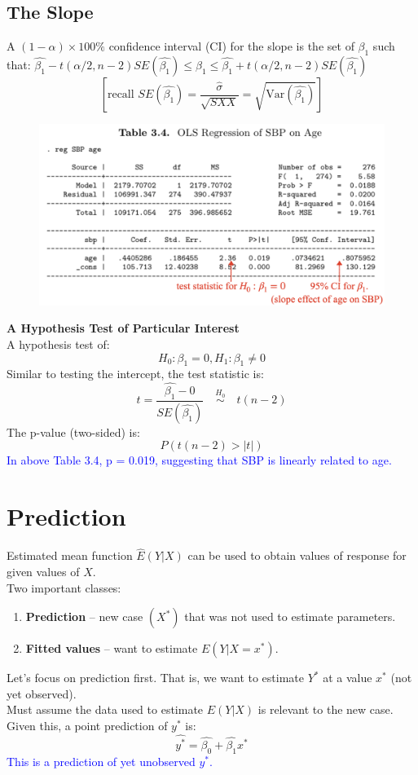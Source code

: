\documentclass[14pt]{extarticle}
\begin{document}
\subsection*{The Slope}

A $(1-\alpha) \times 100\%$ confidence interval (CI) for the slope is the set of $\beta_1$ such that:
$\hat{\beta_1} - t\left(\alpha/2, n-2\right) SE(\hat{\beta_1}) \leq \beta_1 \leq \hat{\beta_1} + t\left(\alpha/2, n-2\right) SE(\hat{\beta_1})$
\[
\left[\text{recall } SE(\hat{\beta_1}) = \frac{\hat{\sigma}}{\sqrt{SXX}} = \sqrt{\text{Var}(\hat{\beta_1})}\right]
\]
\begin{figure}[H]
    \centering
    \includegraphics[width=1\textwidth]{fig8.png}
\end{figure}
\noindent
\textbf{A Hypothesis Test of Particular Interest}\\
A hypothesis test of:
\[
H_0: \beta_1 = 0, 
H_1: \beta_1 \neq 0
\]
Similar to testing the intercept, the test statistic is:
\[
t = \frac{\hat{\beta_1} - 0}{SE(\hat{\beta_1})} \quad \overset{H_0}{\sim} \quad t(n-2)
\]
The p-value (two-sided) is:
\[
P\left( t(n-2) > |t| \right)
\]
\textcolor{blue}{In above Table 3.4, p = 0.019, suggesting that SBP is linearly related to age.}

\section*{Prediction}
\noindent
Estimated mean function $\hat{E}(Y|X)$ can be used to obtain values of response for given values of $X$.\\
Two important classes:
\begin{enumerate}
    \item \textbf{Prediction} – new case $(X^*)$ that was not used to estimate parameters.
    \item \textbf{Fitted values} – want to estimate $E(Y|X = x^*)$.
\end{enumerate}
Let's focus on prediction first. That is, we want to estimate $Y^*$ at a value $x^*$ (not yet observed).\\
Must assume the data used to estimate $E(Y|X)$ is relevant to the new case.\\
Given this, a point prediction of $y^*$ is:
\[
\hat{y^*} = \hat{\beta_0} + \hat{\beta_1} x^*
\]
\textcolor{blue}{This is a prediction of yet unobserved $y^*$.}
\end{document}
